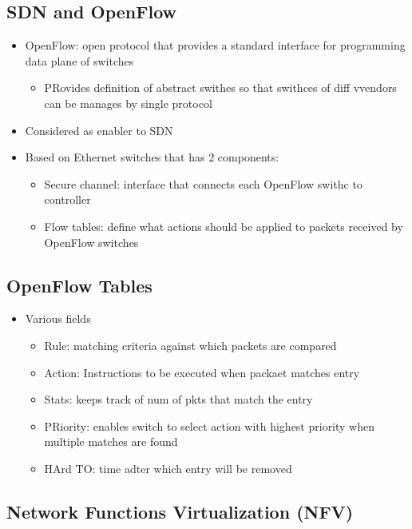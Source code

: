 \subsection{SDN and OpenFlow}

\begin{itemize}
	\item OpenFlow: open protocol that provides a standard interface for
		programming data plane of switches
	\begin{itemize}
		\item PRovides definition of abstract swithes so that swithces
			of diff vvendors can be manages by single protocol
	\end{itemize}
	\item Considered as enabler to SDN
	\item Based on Ethernet switches that has 2 components:
	\begin{itemize}
		\item Secure channel: interface that connects each OpenFlow
			swithc to controller
		\item Flow tables: define what actions should be applied to
			packets received by OpenFlow switches
	\end{itemize}
\end{itemize}

\subsection{OpenFlow Tables}

\begin{itemize}
	\item Various fields
	\begin{itemize}
		\item Rule: matching criteria against which packets are compared
		\item Action: Instructions to be executed when packaet matches
			entry
		\item Stats: keeps track of num of pkts that match the entry
		\item PRiority: enables switch to select action with highest
			priority when multiple matches are found
		\item HArd TO: time adter which entry will be removed
	\end{itemize}
\end{itemize}

\subsection{Network Functions Virtualization (NFV)}

